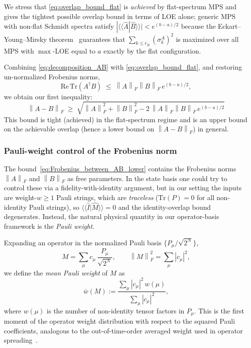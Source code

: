 \documentclass[%
 reprint,
superscriptaddress,
 amsmath,amssymb,
 aps,
]{revtex4-2}
\newcommand{\norm}[1]{\left\lVert#1\right\rVert}
\begin{document}
We stress that \eqref{eq:overlap_bound_flat} is \emph{achieved} by flat-spectrum MPS and gives the tightest possible overlap bound in terms of LOE alone; generic MPS with non-flat Schmidt spectra satisfy $|\langle\langle\hat A|\hat B\rangle\rangle|<e^{(b-a)/2}$ because the Eckart--Young--Mirsky theorem~\cite{eckart1936approximation,mirsky1960symmetric} guarantees that $\sum_{k\le r_B}(\sigma_k^A)^2$ is maximized over all MPS with $\max$-LOE equal to $a$ exactly by the flat configuration.

Combining \eqref{eq:decomposition_AB} with \eqref{eq:overlap_bound_flat}, and restoring un-normalized Frobenius norms,
\begin{equation}
    \mathrm{Re}\,\mathrm{Tr}(A^\dagger B) \;\le\; \norm{A}_F\norm{B}_F\,e^{(b-a)/2},
\end{equation}
we obtain our first inequality:
\begin{equation}
    \boxed{\;\norm{A-B}_F \;\ge\; \sqrt{\norm{A}_F^2+\norm{B}_F^2-2\,\norm{A}_F\norm{B}_F\,e^{(b-a)/2}}\;}
    \label{eq:Frobenius_between_AB_lower}
\end{equation}
This bound is tight (achieved) in the flat-spectrum regime and is an upper bound on the achievable overlap (hence a lower bound on $\norm{A-B}_F$) in general.

\subsubsection{Pauli-weight control of the Frobenius norm}

The bound~\eqref{eq:Frobenius_between_AB_lower} contains the Frobenius norms $\norm{A}_F$ and $\norm{B}_F$ as free parameters. In the state basis one could try to control these via a fidelity-with-identity argument, but in our setting the inputs are weight-$w\ge 1$ Pauli strings, which are \emph{traceless} ($\mathrm{Tr}(P)=0$ for all non-identity Pauli strings), so $\langle\langle\hat I|\hat M\rangle\rangle=0$ and the identity-overlap bound degenerates. Instead, the natural physical quantity in our operator-basis framework is the \emph{Pauli weight}.

Expanding an operator in the normalized Pauli basis $\{P_\mu/\sqrt{2^N}\}$,
\begin{equation}
    M = \sum_{\mu} c_\mu\,\frac{P_\mu}{\sqrt{2^N}},\qquad \norm{M}_F^2 = \sum_\mu |c_\mu|^2,
\end{equation}
we define the \emph{mean Pauli weight} of $M$ as
\begin{equation}
    \bar w(M) := \frac{\sum_\mu |c_\mu|^2 \, w(\mu)}{\sum_\mu |c_\mu|^2},
\end{equation}
where $w(\mu)$ is the number of non-identity tensor factors in $P_\mu$. This is the first moment of the operator weight distribution with respect to the squared Pauli coefficients, analogous to the out-of-time-order averaged weight used in operator spreading~\cite{nahum2018operator,vonKeyserlingk2018operatorhydrodynamics}.
\end{document}
